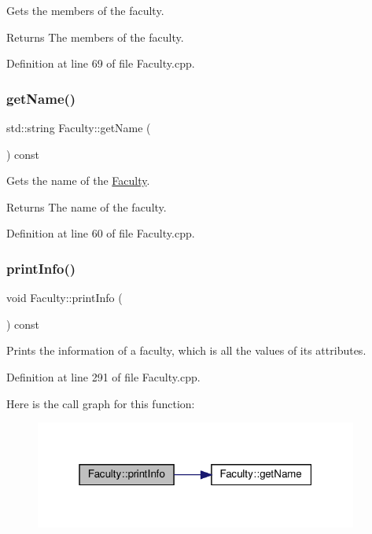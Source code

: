 Gets the members of the faculty. \begin{DoxyReturn}{Returns}
The members of the faculty. 
\end{DoxyReturn}


Definition at line 69 of file Faculty.\+cpp.

\mbox{\label{classFaculty_ad255367a0946117c9161a7214bc0e99d}} 
\subsubsection{\texorpdfstring{get\+Name()}{getName()}}
{\footnotesize\ttfamily std\+::string Faculty\+::get\+Name (\begin{DoxyParamCaption}{ }\end{DoxyParamCaption}) const}

Gets the name of the \hyperlink{classFaculty}{Faculty}. \begin{DoxyReturn}{Returns}
The name of the faculty. 
\end{DoxyReturn}


Definition at line 60 of file Faculty.\+cpp.

\mbox{\label{classFaculty_aafc38827c052623298d74669ae908397}} 
\subsubsection{\texorpdfstring{print\+Info()}{printInfo()}}
{\footnotesize\ttfamily void Faculty\+::print\+Info (\begin{DoxyParamCaption}{ }\end{DoxyParamCaption}) const}

Prints the information of a faculty, which is all the values of its attributes. 

Definition at line 291 of file Faculty.\+cpp.

Here is the call graph for this function\+:\nopagebreak
\begin{figure}[H]
\begin{center}
\leavevmode
\includegraphics[width=301pt]{classFaculty_aafc38827c052623298d74669ae908397_cgraph}
\end{center}
\end{figure}
\mbox{\label{classFaculty_adf74199027a7cfb4d873cb72173b6e5b}} 
